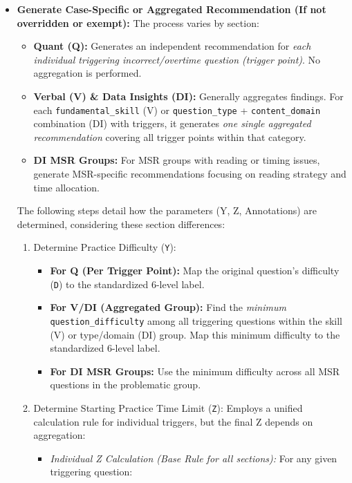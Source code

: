 \documentclass{article}
\begin{document}
\begin{enumerate}
\begin{itemize}
        \item \textbf{Generate Case-Specific or Aggregated Recommendation (If not overridden or exempt):} The process varies by section:
            \begin{itemize}
                \item \textbf{Quant (Q):} Generates an independent recommendation for \textit{each individual triggering incorrect/overtime question (trigger point)}. No aggregation is performed.
                \item \textbf{Verbal (V) \& Data Insights (DI):} Generally aggregates findings. For each \texttt{fundamental\_skill} (V) or \texttt{question\_type} + \texttt{content\_domain} combination (DI) with triggers, it generates \textit{one single aggregated recommendation} covering all trigger points within that category.
                \item \textbf{DI MSR Groups:} For MSR groups with reading or timing issues, generate MSR-specific recommendations focusing on reading strategy and time allocation.
            \end{itemize}
            The following steps detail how the parameters (Y, Z, Annotations) are determined, considering these section differences:
            \begin{enumerate}
                \item Determine Practice Difficulty (\texttt{Y}):
                    \begin{itemize}
                        \item \textbf{For Q (Per Trigger Point):} Map the original question's difficulty (\texttt{D}) to the standardized 6-level label.
                        \item \textbf{For V/DI (Aggregated Group):} Find the \textit{minimum} \texttt{question\_difficulty} among all triggering questions within the skill (V) or type/domain (DI) group. Map this minimum difficulty to the standardized 6-level label.
                        \item \textbf{For DI MSR Groups:} Use the minimum difficulty across all MSR questions in the problematic group.
                    \end{itemize}
                \item Determine Starting Practice Time Limit (\texttt{Z}): Employs a unified calculation rule for individual triggers, but the final Z depends on aggregation:
                    \begin{itemize}
                        \item \textit{Individual Z Calculation (Base Rule for all sections):} For any given triggering question:

\end{itemize}
\end{enumerate}
\end{itemize}
\end{enumerate}
\end{document}
